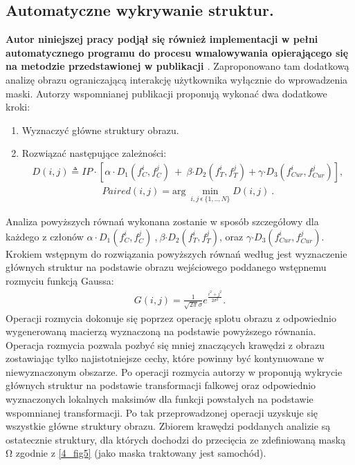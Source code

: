 \documentclass[12pt, twoside, openany]{report}
\theoremstyle{definition}
\begin{document}
\subsection{Automatyczne wykrywanie struktur.}
\textbf{Autor niniejszej pracy podjął się również implementacji w pełni automatycznego programu do procesu wmalowywania opierającego się na metodzie przedstawionej w publikacji \cite{SalientStrucTexProp}}. Zaproponowano tam  dodatkową analizę obrazu ograniczającą interakcję użytkownika wyłącznie do wprowadzenia maski. Autorzy wspomnianej publikacji proponują wykonać dwa dodatkowe kroki:
\begin{enumerate}
\item
Wyznaczyć główne struktury obrazu.
\item
Rozwiązać następujące zależności:
\begin{align}
D(i,j)\triangleq IP\cdot \left[\alpha \cdot D_1\left(f^i_C,f^j_C\right)\ +\ \beta {\cdot D}_2\left(f^i_T,f^j_T\right)+\gamma {\cdot D}_3\left(f^i_{Cur},f^j_{Cur}\right)\right],
\label{SalientDistance}
\end{align}
\begin{align}
Paired\left(i,j\right)={\mathrm{arg}\ \mathop{\mathrm{min}}_{i,j\ \epsilon \mathrm{\ }\{1,..,N\}} D(i,j)\ }.
\label{SalientPair}
\end{align}
\end{enumerate}
Analiza powyższych równań wykonana zostanie w sposób szczegółowy dla każdego z członów $\alpha \cdot D_1\left(f^i_C,f^j_C\right)\ $,$\ \beta {\cdot D}_2\left(f^i_T,f^j_T\right)$, oraz $\gamma {\cdot D}_3\left(f^i_{Cur},f^j_{Cur}\right)$. Krokiem wstępnym do rozwiązania powyższych równań według \cite{SalientStrucTexProp} jest wyznaczenie głównych struktur na podstawie obrazu wejściowego poddanego wstępnemu rozmyciu funkcją Gaussa:
\begin{align}
G\left(i,j\right)=\frac{1}{\sqrt{2\pi }\sigma }e^{\frac{i^2+j^2}{2{\sigma }^2}}.
\label{rozmycieGaussa}
\end{align}
Operacji rozmycia dokonuje się poprzez operację splotu obrazu z odpowiednio wygenerowaną macierzą wyznaczoną na podstawie powyższego równania. Operacja rozmycia pozwala pozbyć się mniej znaczących krawędzi z obrazu zostawiając tylko najistotniejsze cechy, które powinny być kontynuowane w niewyznaczonym obszarze. Po operacji rozmycia autorzy w \cite{SalientStrucTexProp} proponują wykrycie głównych struktur na podstawie transformacji falkowej oraz odpowiednio wyznaczonych lokalnych maksimów dla funkcji powstałych na podstawie wspomnianej transformacji. Po tak  przeprowadzonej operacji uzyskuje się wszystkie główne struktury obrazu. Zbiorem krawędzi poddanych analizie są ostatecznie struktury, dla których dochodzi do przecięcia ze zdefiniowaną maską $\mathrm{\Omega }$ zgodnie z \autoref{4_fig5} (jako maska traktowany jest samochód).
\end{document}
